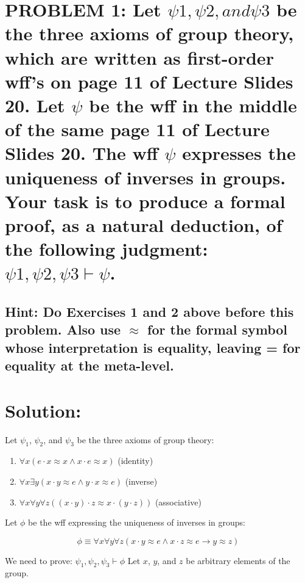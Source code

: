 \documentclass{article}
\newcommand{\proves}{\vdash}
\begin{document}
\newpage
\section*{PROBLEM 1: Let $\psi1, \psi2, and \psi3$ be the three axioms of group theory, which are written as
first-order wff’s on page 11 of Lecture Slides 20. Let $\psi$ be the wff in the middle of the same page
11 of Lecture Slides 20. The wff $\psi$ expresses the uniqueness of inverses in groups. Your task is to
produce a formal proof, as a natural deduction, of the following judgment:
$\psi1, \psi2, \psi3 \vdash \psi$.}

\subsection*{Hint: Do Exercises 1 and 2 above before this problem. Also use $\approx$ for the formal symbol whose
interpretation is equality, leaving = for equality at the meta-level.
}


\section*{Solution:}
Let $\psi_1$, $\psi_2$, and $\psi_3$ be the three axioms of group theory:

\begin{enumerate}
    \item $\forall x (e \cdot x \approx x \wedge x \cdot e \approx x)$ (identity)
    \item $\forall x \exists y (x \cdot y \approx e \wedge y \cdot x \approx e)$ (inverse)
    \item $\forall x \forall y \forall z ((x \cdot y) \cdot z \approx x \cdot (y \cdot z))$ (associative)
\end{enumerate}

Let $\phi$ be the wff expressing the uniqueness of inverses in groups:

\[\phi \equiv \forall x \forall y \forall z (x \cdot y \approx e \wedge x \cdot z \approx e \to y \approx z)\]

We need to prove: $\psi_1, \psi_2, \psi_3 \proves \phi$
Let $x$, $y$, and $z$ be arbitrary elements of the group.
\end{document}
